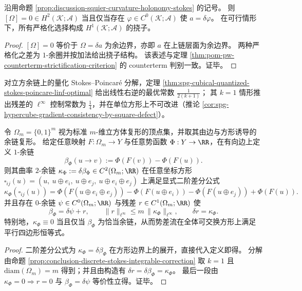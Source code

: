 \begin{corollary}[严格化的判别与参数空间]\label{cor:discussion-squier-zero-curvature-strictification}
沿用命题 \ref{prop:discussion-squier-curvature-holonomy-stokes} 的记号。
则 \([\Omega]=0\in H^2(\mathcal K;\mathcal A)\) 当且仅当存在 \(\varphi\in C^0(\mathcal K;\mathcal A)\) 使 \(a=\delta\varphi\)。
在可行情形下，所有严格化选择构成 \(H^1(\mathcal K;\mathcal A)\) 的挠子。
\end{corollary}
\begin{proof}
\([\Omega]=0\) 等价于 \(\Omega=\delta a\) 为余边界，亦即 \(a\) 在上链层面为余边界。
两种严格化之差为 \(1\)-余圈并按加法给出挠子结构。
该表述与定理 \ref{thm:pom-pw-counterterm-strictification-criterion} 的 counterterm 判别一致。证毕。
\end{proof}

\begin{remark}\label{rem:discussion-linf-strictification-quarter}
对立方余链上的量化 Stokes--Poincar\'e 分解，定理 \ref{thm:spg-cubical-quantized-stokes-poincare-linf-optimal} 给出线性右逆的最优常数 \(\frac{1}{2(k+1)}\)；
其 \(k=1\) 情形推出残差的 \(\ell^\infty\) 控制常数为 \(\frac14\)，并在单位方形上不可改进（推论 \ref{cor:spg-hypercube-gradient-consistency-by-square-defect}）。
\end{remark}

\begin{proposition}[超立方体势差流的曲率闭式与受控严格化分解]\label{prop:discussion-hypercube-potential-curvature-controlled-strictification}
令 \(\Omega_m=\{0,1\}^m\) 视为标准 \(m\)-维立方体复形的顶点集，并取其由边与方形诱导的余链复形。
给定任意映射 \(F:\Omega_m\to Y\) 与任意势函数 \(\Phi:Y\to\RR\)，在有向边上定义 \(1\)-余链
\[
\beta_\Phi(u\to v):=\Phi(F(v))-\Phi(F(u)).
\]
则其曲率 \(2\)-余链 \(\kappa_\Phi:=\delta\beta_\Phi\in C^2(\Omega_m;\RR)\) 在任意坐标方形
\(
\square_{ij}(u)=(u,\ u\oplus e_i,\ u\oplus e_j,\ u\oplus e_i\oplus e_j)
\)
上满足显式二阶差分公式
\[
\kappa_\Phi(\square_{ij}(u))
=
\Phi(F(u\oplus e_i\oplus e_j))-\Phi(F(u\oplus e_i))-\Phi(F(u\oplus e_j))+\Phi(F(u)).
\]
并且存在 \(0\)-余链 \(\psi\in C^0(\Omega_m;\RR)\) 与残差 \(r\in C^1(\Omega_m;\RR)\) 使
\[
\beta_\Phi=\delta\psi+r,
\qquad
\|r\|_{\ell^\infty}\le m\,\|\kappa_\Phi\|_{\ell^\infty},
\qquad
\delta r=\kappa_\Phi.
\]
特别地，\(\kappa_\Phi\equiv 0\) 当且仅当 \(\beta_\Phi\) 为恰当余链，从而势差流在全体可交换方形上满足平行四边形恒等式。
\end{proposition}
\begin{proof}
二阶差分公式为 \(\kappa_\Phi=\delta\beta_\Phi\) 在方形边界上的展开，直接代入定义即得。
分解由命题 \ref{prop:conclusion-discrete-stokes-integrable-correction} 取 \(k=1\) 且 \(\mathrm{diam}(\Omega_m)=m\) 得到；并且由构造有 \(\delta r=\delta\beta_\Phi=\kappa_\Phi\)。
最后一段由 \(\kappa_\Phi=0\Rightarrow r=0\) 与 \(\beta_\Phi=\delta\psi\) 等价性立得。证毕。
\end{proof}

